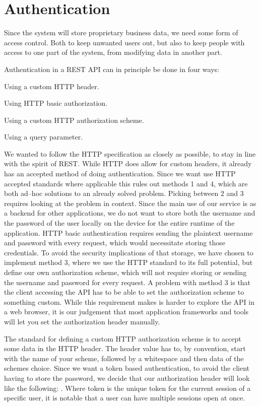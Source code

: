 \section{Authentication}

Since the system will store proprietary business data, we need some form of
access control. Both to keep unwanted users out, but also to keep people with
access to one part of the system, from modifying data in another part.

Authentication in a REST API can in principle be done in four ways:

\begin{enumberate}
    \item Using a custom HTTP header.
    \item Using HTTP basic authorization.
    \item Using a custom HTTP authorization scheme.
    \item Using a query parameter.
\end{enumberate}

We wanted to follow the HTTP specification as closely as possible, to stay in
line with the spirit of REST\@. While HTTP does allow for custom headers, it
already has an accepted method of doing authentication. Since we want use HTTP
accepted standards where applicable this rules out methods 1 and 4, which are
both ad--hoc solutions to an already solved problem. Picking between 2 and
3 requires looking at the problem in context. Since the main use of our service
is as a backend for other applications, we do not want to store both the
username and the password of the user locally on the device for the entire
runtime of the application. HTTP basic authentication requires sending the
plaintext username and password with every request, which would necessitate
storing those credentials. To avoid the security implications of that storage,
we have chosen to implement method 3, where we use the HTTP standard to its full
potential, but define our own authorization scheme, which will not require
storing or sending the username and password for every request.\cite{http_basic}
A problem with method 3 is that the client accessing the API has to be able to
set the authorization scheme to something custom. While this requirement makes
is harder to explore the API in a web browser, it is our judgement that most
application frameworks and tools will let you set the authorization header
manually.

The standard for defining a custom HTTP authorization scheme is to accept some
data in the HTTP  header. The header value has to, by
convention, start with the name of your scheme, followed by a whitespace and
then data of the schemes choice\cite{http_basic}. Since we want a token based
authentication, to avoid the client having to store the password, we decide that
our authorization header will look like the following: . Where token is the unique token for the current session of
a specific user, it is notable that a user can have multiple sessions open at
once.

